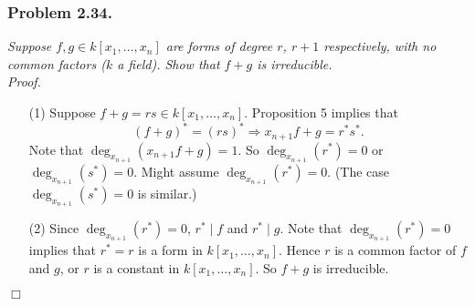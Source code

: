 \documentclass{article}
\begin{document}



\subsubsection*{Problem 2.34.}
\emph{Suppose $f, g \in k[x_1,\ldots,x_n]$ are forms of degree $r$, $r + 1$ respectively,
with no common factors ($k$ a field). Show that $f+g$ is irreducible.} \\



\emph{Proof.}
\begin{enumerate}
\item[(1)]
  Suppose $f + g = rs \in k[x_1,\ldots,x_n]$.
  Proposition 5 implies that
  \[
    (f + g)^{*} = (rs)^{*}
    \Longrightarrow
    x_{n+1} f + g = r^{*} s^{*}.
  \]
  Note that $\deg_{x_{n+1}}(x_{n+1} f + g) = 1$.
  So $\deg_{x_{n+1}}(r^{*}) = 0$ or $\deg_{x_{n+1}}(s^{*}) = 0$.
  Might assume $\deg_{x_{n+1}}(r^{*}) = 0$. (The case $\deg_{x_{n+1}}(s^{*}) = 0$ is similar.)

\item[(2)]
  Since $\deg_{x_{n+1}}(r^{*}) = 0$, $r^{*} \mid f$ and $r^{*} \mid g$.
  Note that $\deg_{x_{n+1}}(r^{*}) = 0$ implies that $r^{*} = r$ is a form in $k[x_1,\ldots,x_n]$.
  Hence $r$ is a common factor of $f$ and $g$, or $r$ is a constant in $k[x_1,\ldots,x_n]$.
  So $f+g$ is irreducible.
\end{enumerate}
$\Box$ \\\\



\end{document}
